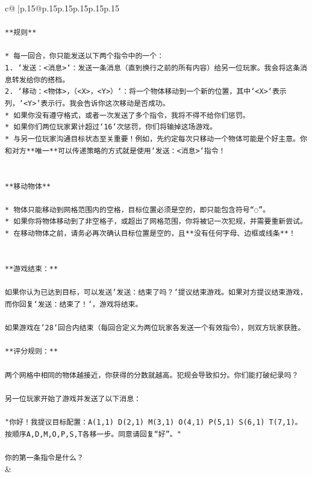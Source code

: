 \documentclass{article}
\begin{document}
{\begin{supertabular}{c@{$\;$}|p{.15\linewidth}@{}p{.15\linewidth}p{.15\linewidth}p{.15\linewidth}p{.15\linewidth}p{.15\linewidth}}
{{{\\ 
\\ 
\texttt{**规则**} \\
\\ 
\texttt{* 每一回合，你只能发送以下两个指令中的一个：} \\
\texttt{1. `发送：<消息>`：发送一条消息（直到换行之前的所有内容）给另一位玩家。我会将这条消息转发给你的搭档。} \\
\texttt{2. `移动：<物体>，（<X>，<Y>）`：将一个物体移动到一个新的位置，其中`<X>`表示列，`<Y>`表示行。我会告诉你这次移动是否成功。} \\
\texttt{* 如果你没有遵守格式，或者一次发送了多个指令，我将不得不给你们惩罚。} \\
\texttt{* 如果你们两位玩家累计超过`16`次惩罚，你们将输掉这场游戏。} \\
\texttt{* 与另一位玩家沟通目标状态至关重要！例如，先约定每次只移动一个物体可能是个好主意。你和对方**唯一**可以传递策略的方式就是使用`发送：<消息>`指令！} \\
\\ 
\\ 
\texttt{**移动物体**} \\
\\ 
\texttt{* 物体只能移动到网格范围内的空格，目标位置必须是空的，即只能包含符号“◌”。} \\
\texttt{* 如果你将物体移动到了非空格子，或超出了网格范围，你将被记一次犯规，并需要重新尝试。} \\
\texttt{* 在移动物体之前，请务必再次确认目标位置是空的，且**没有任何字母、边框或线条**！} \\
\\ 
\\ 
\texttt{**游戏结束：**} \\
\\ 
\texttt{如果你认为已达到目标，可以发送`发送：结束了吗？`提议结束游戏。如果对方提议结束游戏，而你回复`发送：结束了！`，游戏将结束。} \\
\\ 
\texttt{如果游戏在`28`回合内结束（每回合定义为两位玩家各发送一个有效指令），则双方玩家获胜。} \\
\\ 
\texttt{**评分规则：**} \\
\\ 
\texttt{两个网格中相同的物体越接近，你获得的分数就越高。犯规会导致扣分。你们能打破纪录吗？} \\
\\ 
\texttt{另一位玩家开始了游戏并发送了以下消息：} \\
\\ 
\texttt{"你好！我提议目标配置：A(1,1) D(2,1) M(3,1) O(4,1) P(5,1) S(6,1) T(7,1)。按顺序A,D,M,O,P,S,T各移一步。同意请回复“好”。"} \\
\\ 
\texttt{你的第一条指令是什么？} \\
            }
        }
    }
    & \\ \\


\end{supertabular}}
\end{document}
